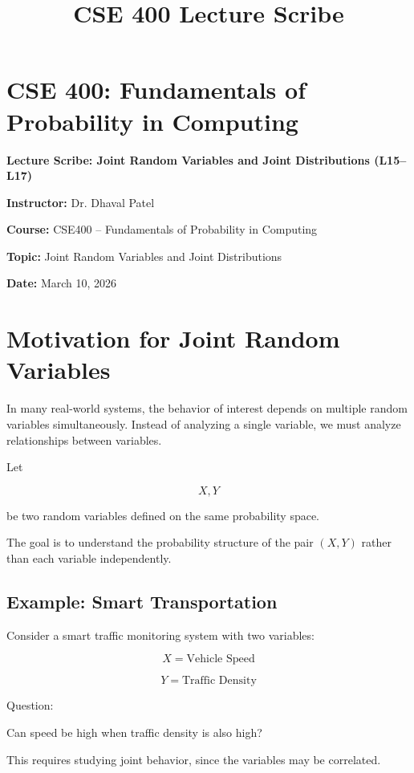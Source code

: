\documentclass[12pt]{article}
\title{CSE 400 Lecture Scribe}
\date{}
\begin{document}
\maketitle

\section*{CSE 400: Fundamentals of Probability in Computing}

\textbf{Lecture Scribe: Joint Random Variables and Joint Distributions (L15--L17)}

\textbf{Instructor:} Dr. Dhaval Patel

\textbf{Course:} CSE400 -- Fundamentals of Probability in Computing

\bigskip

\textbf{Topic:} Joint Random Variables and Joint Distributions

\textbf{Date:} March 10, 2026

\section{Motivation for Joint Random Variables}

In many real-world systems, the behavior of interest depends on multiple random variables simultaneously. Instead of analyzing a single variable, we must analyze relationships between variables.

Let

\[
X, Y
\]

be two random variables defined on the same probability space.

The goal is to understand the probability structure of the pair $(X,Y)$ rather than each variable independently.

\subsection{Example: Smart Transportation}

Consider a smart traffic monitoring system with two variables:

\[
X = \text{Vehicle Speed}
\]

\[
Y = \text{Traffic Density}
\]

Question:

Can speed be high when traffic density is also high?

This requires studying joint behavior, since the variables may be correlated.
\end{document}
